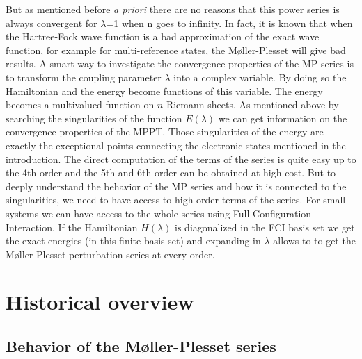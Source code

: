 \documentclass[11pt,a4paper]{article}
\begin{document}
But as mentioned before \textit{a priori} there are no reasons that this power series is always convergent for $\lambda$=1 when n goes to infinity. In fact, it is known that when the Hartree-Fock wave function is a bad approximation of the exact wave function, for example for multi-reference states, the M{\o}ller-Plesset will give bad results\cite{Gill_1986, Gill_1988, Handy_1985, Lepetit_1988}. A smart way to investigate the convergence properties of the MP series is to transform the coupling parameter $\lambda$ into a complex variable. By doing so the Hamiltonian and the energy become functions of this variable. The energy becomes a multivalued function on $n$ Riemann sheets. As mentioned above by searching the singularities of the function $E(\lambda)$ we can get information on the convergence properties of the MPPT. Those singularities of the energy are exactly the exceptional points connecting the electronic states mentioned in the introduction. The direct computation of the terms of the series is quite easy up to the 4th order and the 5th and 6th order can be obtained at high cost. But to deeply understand the behavior of the MP series and how it is connected to the singularities, we need to have access to high order terms of the series. For small systems we can have access to the whole series using Full Configuration Interaction. If the Hamiltonian $H(\lambda)$ is diagonalized in the FCI basis set we get the exact energies (in this finite basis set) and expanding in $\lambda$ allows to to get the M{\o}ller-Plesset perturbation series at every order.

\section{Historical overview}

\subsection{Behavior of the M{\o}ller-Plesset series}
\end{document}
